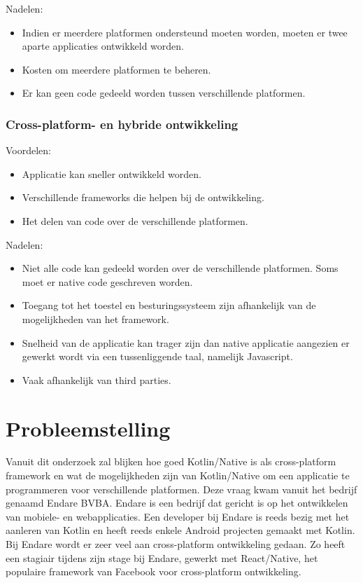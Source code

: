 Nadelen:
\begin{itemize}
	\item Indien er meerdere platformen ondersteund moeten worden, moeten er twee aparte applicaties ontwikkeld worden.
	\item Kosten om meerdere platformen te beheren.
	\item Er kan geen code gedeeld worden tussen verschillende platformen.
\end{itemize}

\subsubsection{Cross-platform- en hybride ontwikkeling}
Voordelen:
\begin{itemize}
	\item Applicatie kan sneller ontwikkeld worden.
	\item Verschillende frameworks die helpen bij de ontwikkeling.
	\item Het delen van code over de verschillende platformen.
\end{itemize}

Nadelen:
\begin{itemize}
	\item Niet alle code kan gedeeld worden over de verschillende platformen. Soms moet er native code geschreven worden.
	\item Toegang tot het toestel en besturingssysteem zijn afhankelijk van de mogelijkheden van het framework.
	\item Snelheid van de applicatie kan trager zijn dan native applicatie aangezien er gewerkt wordt via een tussenliggende taal, namelijk Javascript.
	\item Vaak afhankelijk van third parties.
\end{itemize}

\section{Probleemstelling}
\label{sec:probleemstelling}
Vanuit dit onderzoek zal blijken hoe goed Kotlin/Native is als cross-platform framework en wat de mogelijkheden zijn van Kotlin/Native om een applicatie te programmeren voor verschillende platformen. Deze vraag kwam vanuit het bedrijf genaamd Endare BVBA. Endare is een bedrijf dat gericht is op het ontwikkelen van mobiele- en webapplicaties. Een developer bij Endare is reeds bezig met het aanleren van Kotlin en heeft reeds enkele Android projecten gemaakt met Kotlin. Bij Endare wordt er zeer veel aan cross-platform ontwikkeling gedaan. Zo heeft een stagiair tijdens zijn stage bij Endare, gewerkt met React/Native, het populaire framework van Facebook voor cross-platform ontwikkeling.

